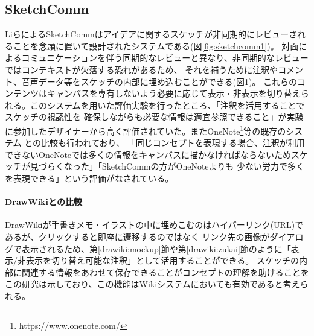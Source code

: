 \subsection{SketchComm}
\label{sketchcomm}

\begin{figure}[H] \begin{minipage}{0.5\hsize}
                      \begin{center} 
                      \end{center} \caption{} \label{fig:sketchcomm1}
\end{minipage} \begin{minipage}{0.5\hsize}
                   \begin{center} 
                   \end{center} \caption{} \label{fig:sketchcomm2}
\end{minipage}
\end{figure}
LiらによるSketchComm\cite{Li2012SketchCommAT}はアイデアに関するスケッチが非同期的にレビューされることを念頭に置いて設計されたシステムである(図\ref{fig:sketchcomm1})。
対面によるコミュニケーションを伴う同期的なレビューと異なり、非同期的なレビューではコンテキストが欠落する恐れがあるため、
それを補うために注釈やコメント、音声データ等をスケッチの内部に埋め込むことができる(図\ref{fig:sketchcomm2})。
これらのコンテンツはキャンバスを専有しないよう必要に応じて表示・非表示を切り替えられる。このシステムを用いた評価実験を行ったところ、「注釈を活用することでスケッチの視認性を
確保しながらも必要な情報は適宜参照できること」が実験に参加したデザイナーから高く評価されていた。またOneNote\footnote{https://www.onenote.com/}等の既存のシステム
との比較も行われており、 「同じコンセプトを表現する場合、注釈が利用できないOneNoteでは多くの情報をキャンバスに描かなければならないためスケッチが見づらくなった」「SketchCommの方がOneNoteよりも
少ない労力で多くを表現できる」という評価がなされている。

\paragraph*{DrawWikiとの比較}
DrawWikiが手書きメモ・イラストの中に埋めこむのはハイパーリンク(URL)であるが、クリックすると即座に遷移するのではなく
リンク先の画像がダイアログで表示されるため、第\ref{drawiki:mockup}節や第\ref{drawiki:zukai}節のように「表示/非表示を切り替え可能な注釈」として活用することができる。
スケッチの内部に関連する情報をあわせて保存できることがコンセプトの理解を助けることをこの研究は示しており、この機能はWikiシステムにおいても有効であると考えられる。